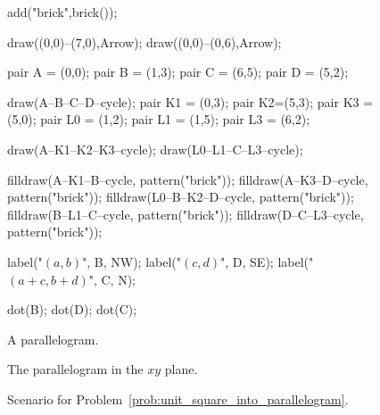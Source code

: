 \documentclass[../gatm.tex]{subfiles}
\begin{document}
\begin{figure}[h]
\begin{center}
\begin{minipage}[b]{0.3\textwidth}
\begin{asy}[width=0.9\textwidth]
				add("brick",brick());
				
				draw((0,0)--(7,0),Arrow);
				draw((0,0)--(0,6),Arrow);
				
				pair A = (0,0);
				pair B = (1,3);
				pair C = (6,5);
				pair D = (5,2);
				
				draw(A--B--C--D--cycle);
				pair K1 = (0,3);
				pair K2=(5,3);
				pair K3 = (5,0);
				pair L0 = (1,2);
				pair L1 = (1,5);
				pair L3 = (6,2);
				
				draw(A--K1--K2--K3--cycle);
				draw(L0--L1--C--L3--cycle);
				
				filldraw(A--K1--B--cycle, pattern("brick"));
				filldraw(A--K3--D--cycle, pattern("brick"));
				filldraw(L0--B--K2--D--cycle, pattern("brick"));
				filldraw(B--L1--C--cycle, pattern("brick"));
				filldraw(D--C--L3--cycle, pattern("brick"));
				
				label("$(a,b)$", B, NW);
				label("$(c,d)$", D, SE);
				label("$(a+c,b+d)$", C, N);
				
				dot(B);
				dot(D);
				dot(C);
			
			\end{asy}
		\end{minipage}
	\end{center}
	\vspace*{-2\baselineskip}
	\begin{center}
		\begin{minipage}[t]{0.3\textwidth}
			\caption{A parallelogram.}
			\label{fig:parallelogram_generic}
		\end{minipage}
		\hfill
		\begin{minipage}[t]{0.3\textwidth}
			\caption{The parallelogram in the $xy$ plane.}
			\label{fig:para_in_xy}
		\end{minipage}
		\hfill
		\begin{minipage}[t]{0.3\textwidth}
			\caption{Scenario for Problem~\ref{prob:unit_square_into_parallelogram}.}
			\label{fig:para_scenario}
		\end{minipage}
	\end{center}
	\vspace*{-2\baselineskip}
\end{figure}
\end{document}
